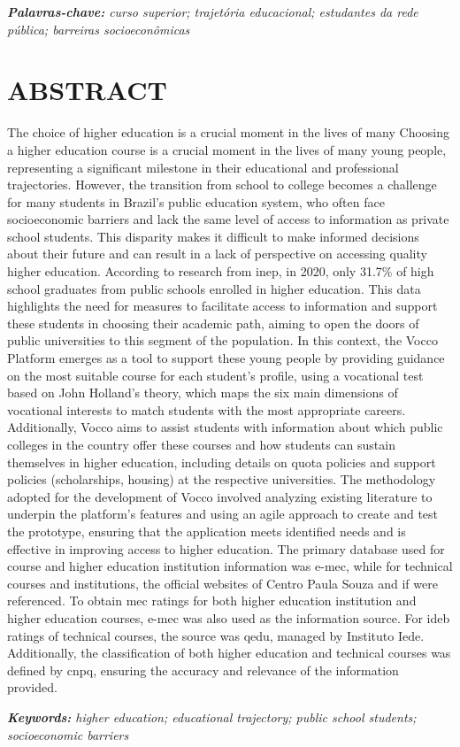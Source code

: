 \vspace{3\baselineskip}
\textit{\textbf{Palavras-chave:} curso superior; trajetória educacional; estudantes da rede pública; barreiras socioeconômicas}


\chapter*{ABSTRACT}
The choice of higher education is a crucial moment in the lives of many Choosing a higher education course is a crucial moment in the lives of many young people, representing a significant milestone in their educational and professional trajectories. However, the transition from school to college becomes a challenge for many students in Brazil’s public education system, who often face socioeconomic barriers and lack the same level of access to information as private school students. This disparity makes it difficult to make informed decisions about their future and can result in a lack of perspective on accessing quality higher education. According to research from \ac{inep}, in 2020, only 31.7\% of high school graduates from public schools enrolled in higher education. This data highlights the need for measures to facilitate access to information and support these students in choosing their academic path, aiming to open the doors of public universities to this segment of the population. In this context, the Vocco Platform emerges as a tool to support these young people by providing guidance on the most suitable course for each student's profile, using a vocational test based on John Holland’s theory, which maps the six main dimensions of vocational interests to match students with the most appropriate careers. Additionally, Vocco aims to assist students with information about which public colleges in the country offer these courses and how students can sustain themselves in higher education, including details on quota policies and support policies (scholarships, housing) at the respective universities. The methodology adopted for the development of Vocco involved analyzing existing literature to underpin the platform's features and using an agile approach to create and test the prototype, ensuring that the application meets identified needs and is effective in improving access to higher education. The primary database used for course and higher education institution information was \ac{e-mec}, while for technical courses and institutions, the official websites of Centro Paula Souza and \ac{if} were referenced. To obtain \ac{mec} ratings for both higher education institution and higher education courses, \ac{e-mec} was also used as the information source. For \ac{ideb} ratings of technical courses, the source was \ac{qedu}, managed by Instituto Iede. Additionally, the classification of both higher education and technical courses was defined by \ac{cnpq}, ensuring the accuracy and relevance of the information provided.

\vspace{3\baselineskip}
\textit{\textbf{Keywords:} higher education; educational trajectory; public school students; socioeconomic barriers}